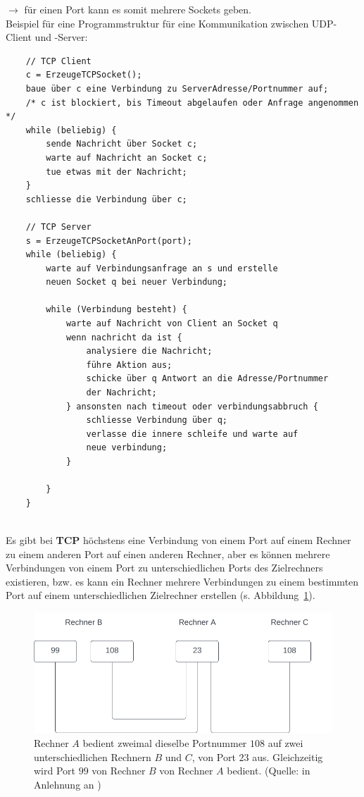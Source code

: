 \noindent
$\rightarrow$ für einen Port kann es somit mehrere Sockets geben.\\


\noindent
Beispiel für eine Programmstruktur für eine Kommunikation zwischen UDP-Client und -Server:
\begin{verbatim}
    // TCP Client
    c = ErzeugeTCPSocket();
    baue über c eine Verbindung zu ServerAdresse/Portnummer auf;
    /* c ist blockiert, bis Timeout abgelaufen oder Anfrage angenommen */
    while (beliebig) {
        sende Nachricht über Socket c;
        warte auf Nachricht an Socket c;
        tue etwas mit der Nachricht;
    }
    schliesse die Verbindung über c;

    // TCP Server
    s = ErzeugeTCPSocketAnPort(port);
    while (beliebig) {
        warte auf Verbindungsanfrage an s und erstelle
        neuen Socket q bei neuer Verbindung;

        while (Verbindung besteht) {
            warte auf Nachricht von Client an Socket q
            wenn nachricht da ist {
                analysiere die Nachricht;
                führe Aktion aus;
                schicke über q Antwort an die Adresse/Portnummer
                der Nachricht;
            } ansonsten nach timeout oder verbindungsabbruch {
                schliesse Verbindung über q;
                verlasse die innere schleife und warte auf
                neue verbindung;
            }

        }
    }
\end{verbatim}\\

\noindent
Es gibt bei \textbf{TCP} höchstens eine Verbindung von einem Port auf einem Rechner zu einem anderen Port auf einen anderen Rechner, aber es können mehrere Verbindungen von einem Port zu unterschiedlichen Ports des Zielrechners existieren, bzw. es kann ein Rechner mehrere Verbindungen zu einem bestimmten Port auf einem unterschiedlichen Zielrechner erstellen (s. Abbildung~\ref{fig:tcpconnections}).


\begin{figure}
    \centering
    \includegraphics[scale=0.5]{chapters/fopt5/img/sockets/tcpconnections}
    \caption[fontsize=\small]{Rechner $A$ bedient zweimal dieselbe Portnummer $108$ auf zwei unterschiedlichen Rechnern $B$ und $C$, von Port $23$ aus. Gleichzeitig wird Port $99$ von Rechner $B$ von Rechner $A$ bedient. (Quelle: in Anlehnung an \cite[265, Bild 5.3]{Oec22})}
    \label{fig:tcpconnections}
\end{figure}


